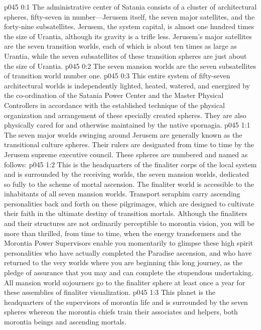 \author{Melchizedek}
\vs p045 0:1 The administrative center of Satania consists of a cluster of architectural spheres, fifty\hyp{}seven in number---Jerusem itself, the seven major satellites, and the forty\hyp{}nine subsatellites. Jerusem, the system capital, is almost one hundred times the size of Urantia, although its gravity is a trifle less. Jerusem’s major satellites are the seven transition worlds, each of which is about ten times as large as Urantia, while the seven subsatellites of these transition spheres are just about the size of Urantia.
\vs p045 0:2 The seven mansion worlds are the seven subsatellites of transition world number one.
\vs p045 0:3 This entire system of fifty\hyp{}seven architectural worlds is independently lighted, heated, watered, and energized by the co\hyp{}ordination of the Satania Power Center and the Master Physical Controllers in accordance with the established technique of the physical organization and arrangement of these specially created spheres. They are also physically cared for and otherwise maintained by the native spornagia.
\vs p045 1:1 The seven major worlds swinging around Jerusem are generally known as the transitional culture spheres. Their rulers are designated from time to time by the Jerusem supreme executive council. These spheres are numbered and named as follows:
\pc \vs p045 1:2  This is the headquarters of the finaliter corps of the local system and is surrounded by the receiving worlds, the seven mansion worlds, dedicated so fully to the scheme of mortal ascension. The finaliter world is accessible to the inhabitants of all seven mansion worlds. Transport seraphim carry ascending personalities back and forth on these pilgrimages, which are designed to cultivate their faith in the ultimate destiny of transition mortals. Although the finaliters and their structures are not ordinarily perceptible to morontia vision, you will be more than thrilled, from time to time, when the energy transformers and the Morontia Power Supervisors enable you momentarily to glimpse these high spirit personalities who have actually completed the Paradise ascension, and who have returned to the very worlds where you are beginning this long journey, as the pledge of assurance that you may and can complete the stupendous undertaking. All mansion world sojourners go to the finaliter sphere at least once a year for these assemblies of finaliter visualization.\plusone
\pc \vs p045 1:3  This planet is the headquarters of the supervisors of morontia life and is surrounded by the seven spheres whereon the morontia chiefs train their associates and helpers, both morontia beings and ascending mortals.
